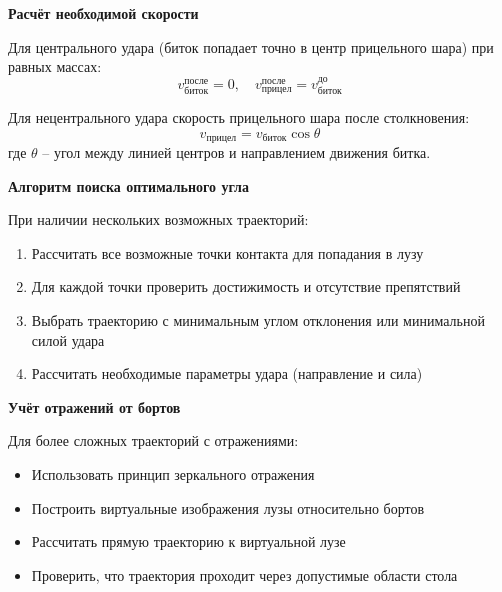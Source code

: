 \begin{center}
    \textbf{Расчёт необходимой скорости}
\end{center}

Для центрального удара (биток попадает точно в центр прицельного шара) при равных массах:
\[
v_{\text{биток}}^{\text{после}} = 0, \quad v_{\text{прицел}}^{\text{после}} = v_{\text{биток}}^{\text{до}}
\]

Для нецентрального удара скорость прицельного шара после столкновения:
\[
v_{\text{прицел}} = v_{\text{биток}} \cos\theta
\]
где $\theta$ -- угол между линией центров и направлением движения битка.

\begin{center}
    \textbf{Алгоритм поиска оптимального угла}
\end{center}

При наличии нескольких возможных траекторий:
\begin{enumerate}
    \item Рассчитать все возможные точки контакта для попадания в лузу
    \item Для каждой точки проверить достижимость и отсутствие препятствий
    \item Выбрать траекторию с минимальным углом отклонения или минимальной силой удара
    \item Рассчитать необходимые параметры удара (направление и сила)
\end{enumerate}

\begin{center}
    \textbf{Учёт отражений от бортов}
\end{center}    

Для более сложных траекторий с отражениями:
\begin{itemize}
    \item Использовать принцип зеркального отражения
    \item Построить виртуальные изображения лузы относительно бортов
    \item Рассчитать прямую траекторию к виртуальной лузе
    \item Проверить, что траектория проходит через допустимые области стола
\end{itemize}